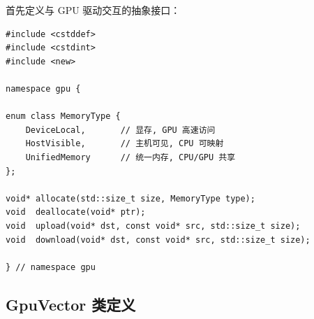 \documentclass[12pt,a4paper,fontset=fandol]{ctexbook}
\begin{document}
首先定义与 GPU 驱动交互的抽象接口：

\begin{lstlisting}
#include <cstddef>
#include <cstdint>
#include <new>

namespace gpu {

enum class MemoryType {
    DeviceLocal,       // 显存, GPU 高速访问
    HostVisible,       // 主机可见, CPU 可映射
    UnifiedMemory      // 统一内存, CPU/GPU 共享
};

void* allocate(std::size_t size, MemoryType type);
void  deallocate(void* ptr);
void  upload(void* dst, const void* src, std::size_t size);
void  download(void* dst, const void* src, std::size_t size);

} // namespace gpu
\end{lstlisting}

\subsection{GpuVector 类定义}
\end{document}
